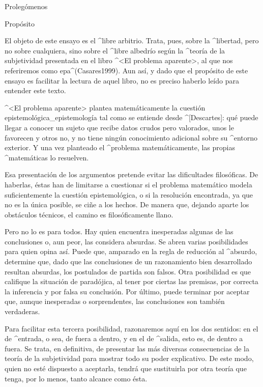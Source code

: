 
\Part Prolegómenos

\Section Propósito

El objeto de este ensayo es el ^{libre arbitrio}. Trata, pues, sobre la
^{libertad}, pero no sobre cualquiera, sino sobre el ^{libre albedrío}
según la ^{teoría de la subjetividad} presentada en el libro ^<El
problema aparente>, al que nos referiremos como {\sc epa}^(Casares1999).
Aun así, y dado que el propósito de este ensayo es facilitar la lectura
de aquel libro, no es preciso haberlo leído para entender este texto.

^<El problema aparente> plantea matemáticamente la cuestión
epistemológica_{epistemología} tal como se entiende desde ^[Descartes]:
qué puede llegar a conocer un sujeto que recibe datos crudos pero
valorados, unos le favorecen y otros no, y no tiene 
ningún conocimiento adicional sobre su ^{entorno} exterior. Y una vez
planteado el ^{problema} matemáticamente, las propias ^{matemáticas} lo
resuelven.

Esa presentación de los argumentos pretende evitar las dificultades
filosóficas. De haberlas, éstas han de limitarse a cuestionar si el
problema matemático modela suficientemente la cuestión epistemológica, o
si la resolución encontrada, ya que no es la única posible, se ciñe a
los hechos. De manera que, dejando aparte los obstáculos técnicos, el
camino es filosóficamente llano.

Pero no lo es para todos. Hay quien encuentra inesperadas algunas de las
conclusiones o, aun peor, las considera absurdas. Se abren varias
posibilidades para quien opina así. Puede que, amparado en la regla de
reducción al ^{absurdo}, determine que, dado que las conclusiones de un
razonamiento bien desarrollado resultan absurdas, los postulados de
partida son falsos. Otra posibilidad es que califique la situación de
paradójica, al tener por ciertas las premisas, por correcta la
inferencia y por falsa su conclusión. Por último, puede terminar por
aceptar que, aunque inesperadas o sorprendentes, las conclusiones son
también verdaderas.

Para facilitar esta tercera posibilidad, razonaremos aquí en los dos
sentidos: en el de ^{entrada}, o sea, de fuera a dentro, y en el de
^{salida}, esto es, de dentro a fuera. Se trata, en definitiva, de
presentar las más diversas consecuencias de la teoría de la subjetividad
para mostrar todo su poder explicativo. De este modo, quien no esté
dispuesto a aceptarla, tendrá que sustituirla por otra teoría que tenga,
por lo menos, tanto alcance como ésta.



